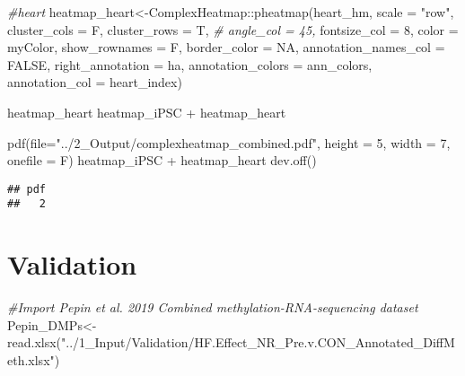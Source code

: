 \documentclass[
  10pt,
]{article}
\newenvironment{Shaded}{\begin{snugshade}}{\end{snugshade}}
\newcommand{\AttributeTok}[1]{\textcolor[rgb]{0.77,0.63,0.00}{#1}}
\newcommand{\CommentTok}[1]{\textcolor[rgb]{0.56,0.35,0.01}{\textit{#1}}}
\newcommand{\ConstantTok}[1]{\textcolor[rgb]{0.00,0.00,0.00}{#1}}
\newcommand{\DecValTok}[1]{\textcolor[rgb]{0.00,0.00,0.81}{#1}}
\newcommand{\FunctionTok}[1]{\textcolor[rgb]{0.00,0.00,0.00}{#1}}
\newcommand{\NormalTok}[1]{#1}
\newcommand{\OtherTok}[1]{\textcolor[rgb]{0.56,0.35,0.01}{#1}}
\newcommand{\SpecialCharTok}[1]{\textcolor[rgb]{0.00,0.00,0.00}{#1}}
\newcommand{\StringTok}[1]{\textcolor[rgb]{0.31,0.60,0.02}{#1}}
\begin{document}
\begin{Shaded}
\begin{Highlighting}[]
\CommentTok{\#heart}
\NormalTok{heatmap\_heart}\OtherTok{\textless{}{-}}\NormalTok{ComplexHeatmap}\SpecialCharTok{::}\FunctionTok{pheatmap}\NormalTok{(heart\_hm, }\AttributeTok{scale =} \StringTok{"row"}\NormalTok{,}
                    \AttributeTok{cluster\_cols =}\NormalTok{ F,}
                    \AttributeTok{cluster\_rows =}\NormalTok{ T,}
                     \CommentTok{\# angle\_col = 45,}
                     \AttributeTok{fontsize\_col =} \DecValTok{8}\NormalTok{,}
                     \AttributeTok{color =}\NormalTok{ myColor,}
                     \AttributeTok{show\_rownames =}\NormalTok{ F,}
                     \AttributeTok{border\_color =} \ConstantTok{NA}\NormalTok{,}
                    \AttributeTok{annotation\_names\_col =} \ConstantTok{FALSE}\NormalTok{,}
                    \AttributeTok{right\_annotation =}\NormalTok{ ha,}
                    \AttributeTok{annotation\_colors =}\NormalTok{ ann\_colors,}
                    \AttributeTok{annotation\_col =}\NormalTok{ heart\_index)}

\NormalTok{heatmap\_heart}
\NormalTok{heatmap\_iPSC }\SpecialCharTok{+}\NormalTok{ heatmap\_heart}

\FunctionTok{pdf}\NormalTok{(}\AttributeTok{file=}\StringTok{"../2\_Output/complexheatmap\_combined.pdf"}\NormalTok{, }\AttributeTok{height =} \DecValTok{5}\NormalTok{, }\AttributeTok{width =} \DecValTok{7}\NormalTok{, }\AttributeTok{onefile =}\NormalTok{ F)}
\NormalTok{heatmap\_iPSC }\SpecialCharTok{+}\NormalTok{ heatmap\_heart}
\FunctionTok{dev.off}\NormalTok{()}
\end{Highlighting}
\end{Shaded}

\begin{verbatim}
## pdf 
##   2
\end{verbatim}

\hypertarget{validation}{%
\section{Validation}\label{validation}}

\begin{Shaded}
\begin{Highlighting}[]
\CommentTok{\#Import Pepin et al. 2019 Combined methylation{-}RNA{-}sequencing dataset}
\NormalTok{Pepin\_DMPs}\OtherTok{\textless{}{-}}\FunctionTok{read.xlsx}\NormalTok{(}\StringTok{"../1\_Input/Validation/HF.Effect\_NR\_Pre.v.CON\_Annotated\_DiffMeth.xlsx"}\NormalTok{)}
\end{Highlighting}
\end{Shaded}
\end{document}
